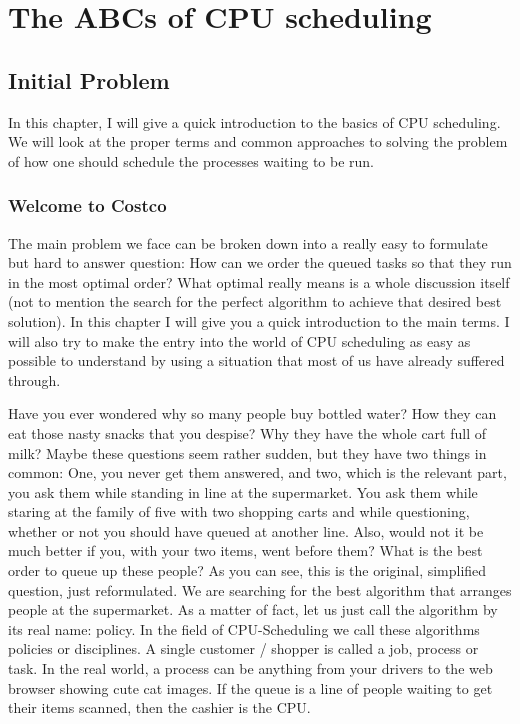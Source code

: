 \chapter{The ABCs of CPU scheduling}

\section{Initial Problem}

In this chapter, I will give a quick introduction to the basics of CPU scheduling. We will look at the proper terms and common approaches to solving the problem of how one should schedule the processes waiting to be run.

\subsection{Welcome to Costco}

The main problem we face can be broken down into a really easy to formulate but hard to answer question:
How can we order the queued tasks so that they run in the most optimal order?
What optimal really means is a whole discussion itself (not to mention the search for the perfect algorithm to achieve that desired best solution).
In this chapter I will give you a quick introduction to the main terms.
I will also try to make the entry into the world of CPU scheduling as easy as possible to understand by using a situation that most of us have already suffered through.

Have you ever wondered why so many people buy bottled water? 
How they can eat those nasty snacks that you despise?
Why they have the whole cart full of milk?
Maybe these questions seem rather sudden, but they have two things in common:
One, you never get them answered, and two, which is the relevant part, you ask them while standing in line at the supermarket.
You ask them while staring at the family of five with two shopping carts and while questioning, whether or not you should have queued at another line.
Also, would not it be much better if you, with your two items, went before them?
What is the best order to queue up these people?
As you can see, this is the original, simplified question, just reformulated.
We are searching for the best algorithm that arranges people at the supermarket.
As a matter of fact, let us just call the algorithm by its real name: policy.
In the field of CPU-Scheduling we call these algorithms policies or disciplines.
A single customer / shopper is called a job, process or task.
In the real world, a process can be anything from your drivers to the web browser showing cute cat images.
If the queue is a line of people waiting to get their items scanned, then the cashier is the CPU.

